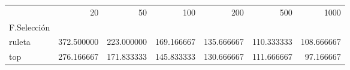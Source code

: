 \begin{tabular}{lrrrrrr}
\toprule
{} &        20   &        50   &        100  &        200  &        500  &        1000 \\
F.Selección &             &             &             &             &             &             \\
\midrule
ruleta      &  372.500000 &  223.000000 &  169.166667 &  135.666667 &  110.333333 &  108.666667 \\
top         &  276.166667 &  171.833333 &  145.833333 &  130.666667 &  111.666667 &   97.166667 \\
\bottomrule
\end{tabular}
